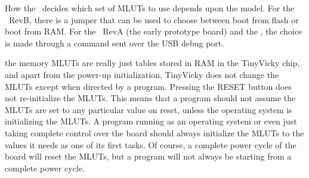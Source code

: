 How the \jr\ decides which set of MLUTs to use depends upon the model. For the \fjr\ RevB, there is a jumper that can be used to choose between boot from flash or boot from RAM. For the \fjr\ RevA (the early prototype board) and the \fk, the choice is made through a command sent over the USB debug port.

\begin{note}
	the memory MLUTs are really just tables stored in RAM in the TinyVicky chip, and apart from the power-up initialization, TinyVicky does not change the MLUTs except when directed by a program. Pressing the RESET button does not re-initialize the MLUTs. This means that a program should not assume the MLUTs are set to any particular value on reset, unless the operating system is initializing the MLUTs. A program running as an operating system or even just taking complete control over the board should always initialize the MLUTs to the values it needs as one of its first tasks. Of course, a complete power cycle of the board will reset the MLUTs, but a program will not always be starting from a complete power cycle.
\end{note}